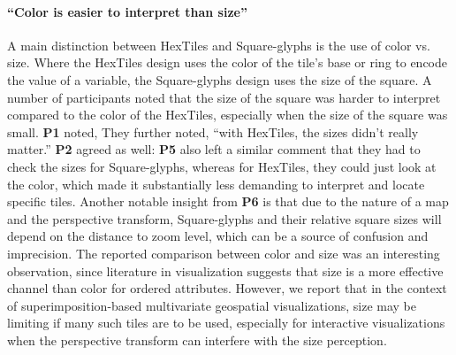 \paragraph{``Color is easier to interpret than size''}
A main distinction between HexTiles and Square-glyphs is the use of color vs. size.
%
Where the HexTiles design uses the color of the tile's base or ring to encode the value of a variable, the Square-glyphs design uses the size of the square.
%
%
A number of participants noted that the size of the square was harder to interpret compared to the color of the HexTiles, especially when the size of the square was small.
%
\textbf{P1} noted, 
%
They further noted, ``with HexTiles, the sizes didn't really matter.''
%
\textbf{P2} agreed as well: 
%
\textbf{P5} also left a similar comment that they had to check the sizes for Square-glyphs, whereas for HexTiles, they could just look at the color, which made it substantially less demanding to interpret and locate specific tiles.
%
Another notable insight from \textbf{P6} is that due to the nature of a map and the perspective transform, Square-glyphs and their relative square sizes will depend on the distance to zoom level, which can be a source of confusion and imprecision.
%
The reported comparison between color and size was an interesting observation, since literature in visualization\cite{Munzner_2015} suggests that size is a more effective channel than color for ordered attributes.
%
However, we report that in the context of superimposition-based multivariate geospatial visualizations, size may be limiting if many such tiles are to be used, especially for interactive visualizations when the perspective transform can interfere with the size perception.

